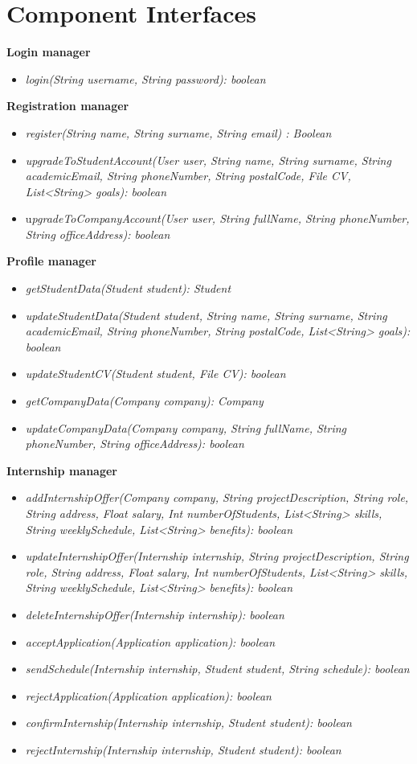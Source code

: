 \section{Component Interfaces}
\label{sec:component_interfaces}
\textbf{Login manager}
\begin{itemize}
    \item \textit{login(String username, String password): boolean}
\end{itemize}
\textbf{Registration manager}
\begin{itemize}
\item \textit{register(String name, String surname, String email) : Boolean}
    \item \textit{upgradeToStudentAccount(User user, String name, String surname, String academicEmail, String phoneNumber, String postalCode, File CV, List<String> goals): boolean}
    \item u\textit{pgradeToCompanyAccount(User user, String fullName, String phoneNumber, String officeAddress): boolean}
\end{itemize}
\textbf{Profile manager}
\begin{itemize}
    \item \textit{getStudentData(Student student): Student}
    \item \textit{updateStudentData(Student student, String name, String surname, String academicEmail, String phoneNumber, String postalCode, List<String> goals): boolean}
    \item \textit{updateStudentCV(Student student, File CV): boolean}
    \item \textit{getCompanyData(Company company): Company}
    \item \textit{updateCompanyData(Company company, String fullName, String phoneNumber, String officeAddress): boolean}
\end{itemize}
\textbf{Internship manager}
\begin{itemize}
    \item \textit{addInternshipOffer(Company company, String projectDescription, String role, String address, Float salary, Int numberOfStudents, List<String> skills, String weeklySchedule, List<String> benefits): boolean}
    \item \textit{updateInternshipOffer(Internship internship, String projectDescription, String role, String address, Float salary, Int numberOfStudents, List<String> skills, String weeklySchedule, List<String> benefits): boolean}
    \item \textit{deleteInternshipOffer(Internship internship): boolean}
    \item \textit{acceptApplication(Application application): boolean}
    \item \textit{sendSchedule(Internship internship, Student student, String schedule): boolean}
    \item \textit{rejectApplication(Application application): boolean}
    \item \textit{confirmInternship(Internship internship, Student student): boolean}
    \item \textit{rejectInternship(Internship internship, Student student): boolean}
\end{itemize}
